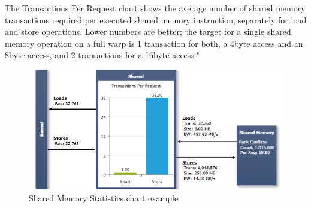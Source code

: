\documentclass[oneside,openright,12pt,final,en]{mgr}
\begin{document}
\begin{itemize}
	The Transactions Per Request chart shows the average number of shared memory transactions required per executed shared memory instruction, separately for load and store operations. Lower numbers are better; the target for a single shared memory operation on a full warp is 1 transaction for both, a 4byte access and an 8byte access, and 2 transactions for a 16byte access."
	
	\begin{figure}[H]
		\centering
		\includegraphics{MemoryStatisticsSharedChart}
		\caption{Shared Memory Statistics chart example}
	\end{figure}


\end{itemize}
\end{document}
